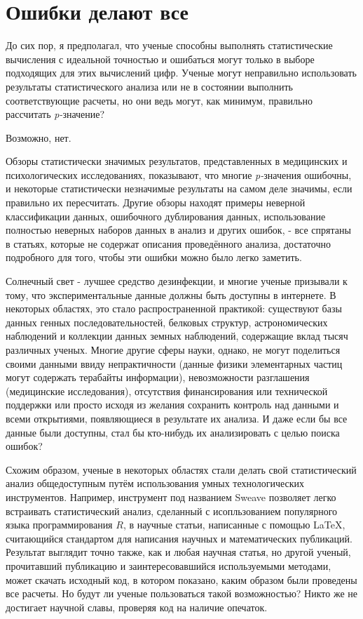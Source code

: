 \chapter{Ошибки делают все}
\label{chp9}

До сих пор, я предполагал, что ученые способны выполнять статистические вычисления с идеальной точностью и ошибаться могут только в выборе подходящих для этих вычислений цифр. Ученые могут неправильно использовать результаты статистического анализа или не в состоянии выполнить соответствующие расчеты, но они ведь могут, как минимум, правильно рассчитать \emph{p-}значение?

Возможно, нет. 

Обзоры статистически значимых результатов, представленных в медицинских и психологических исследованиях, показывают, что многие \emph{p-}значения ошибочны, и некоторые статистически незначимые результаты на самом деле значимы, если правильно их пересчитать. \cite{gotzsche_believability_2006,bakker_misreporting_2011} Другие обзоры находят примеры неверной классификации данных, ошибочного дублирования данных, использование полностью неверных наборов данных в анализ и других ошибок, - все спрятаны в статьях, которые не содержат описания проведённого анализа, достаточно подробного для того, чтобы эти ошибки можно было легко заметить. \cite{baggerly_deriving_2009,gotzsche_methodology_1989} 

Солнечный свет - лучшее средство дезинфекции, и многие ученые призывали к тому, что экспериментальные данные должны быть доступны в интернете. В некоторых областях, это стало распространенной практикой: существуют базы данных генных последовательностей, белковых структур, астрономических наблюдений и коллекции данных земных наблюдений, содержащие вклад тысяч различных ученых. Многие другие сферы науки, однако, не могут поделиться своими данными ввиду непрактичности (данные физики элементарных частиц могут содержать терабайты информации), невозможности разглашения (медицинские исследования), отсутствия финансирования или технической поддержки или просто исходя из желания сохранить контроль над данными и всеми открытиями, появляющиеся в результате их анализа. И даже если бы все данные были доступны, стал бы кто-нибудь их анализировать с целью поиска ошибок?   

Схожим образом, ученые в некоторых областях стали делать свой статистический анализ общедоступным путём использования умных технологических инструментов. Например, инструмент под названием Sweave позволяет легко встраивать статистический анализ, сделанный с исопльзованием популярного языка программирования $R$, в научные статьи, написанные с помощью \LaTeX, считающийся стандартом для написания научных и математических публикаций. Результат выглядит точно также, как и любая научная статья, но другой ученый, прочитавший публикацию и заинтересовавшийся используемыми методами, может скачать исходный код, в котором показано, каким образом были проведены все расчеты. Но будут ли ученые пользоваться такой возможностью? Никто же не достигает научной славы, проверяя код на наличие опечаток.

